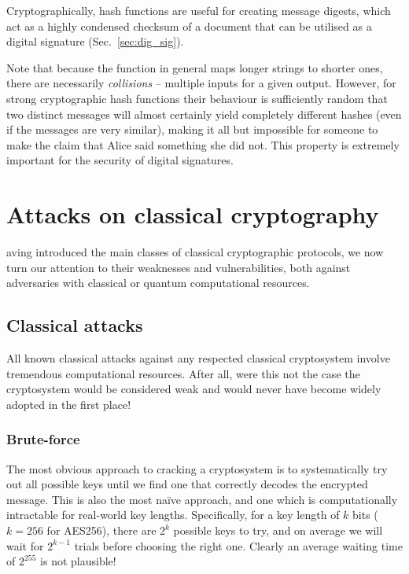 Cryptographically, hash functions are useful for creating message digests, which act as a highly condensed checksum of a document that can be utilised as a digital signature (Sec.~\ref{sec:dig_sig}).

Note that because the function in general maps longer strings to shorter ones, there are necessarily \textit{collisions} -- multiple inputs for a given output. However, for strong cryptographic hash functions their behaviour is sufficiently random that two distinct messages will almost certainly yield completely different hashes (even if the messages are very similar), making it all but impossible for someone to make the claim that Alice said something she did not. This property is extremely important for the security of digital signatures.

%
%

\section{Attacks on classical cryptography}\label{sec:attacks_on_class}

aving introduced the main classes of classical cryptographic protocols, we now turn our attention to their weaknesses and vulnerabilities, both against adversaries with classical or quantum computational resources.

%
%

\subsection{Classical attacks}

All known classical attacks against any respected classical cryptosystem involve tremendous computational resources. After all, were this not the case the cryptosystem would be considered weak and would never have become widely adopted in the first place!

%
%

\subsubsection{Brute-force}\label{sec:brute_force_attack}

The most obvious approach to cracking a cryptosystem is to systematically try out all possible keys until we find one that correctly decodes the encrypted message. This is also the most na\"ive approach, and one which is computationally intractable for real-world key lengths. Specifically, for a key length of $k$ bits (\mbox{$k=256$} for AES256), there are $2^k$ possible keys to try, and on average we will wait for $2^{k-1}$ trials before choosing the right one. Clearly an average waiting time of $2^{255}$ is not plausible!

